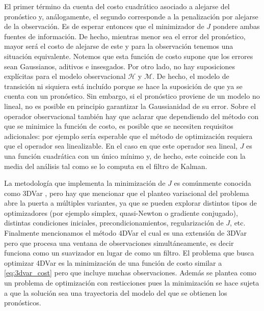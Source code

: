 El primer término da cuenta del costo cuadrático asociado a alejarse del pronóstico y, análogamente, el segundo corresponde a la penalización por alejarse de la observación. Es de esperar entonces que el minimizador de $J$ pondere ambas fuentes de información. De hecho, mientras menor sea el error del pronóstico, mayor será el costo de alejarse de este y para la observación tenemos una situación equivalente. Notemos que esta función de costo supone que los errores sean Gaussianos, aditivos e insesgados. Por otro lado, no hay suposiciones explícitas para el modelo observacional $\mathcal{H}$ y $\mathcal{M}$. De hecho, el modelo de transición ni siquiera está incluído porque se hace la suposición de que ya se cuenta con un pronóstico. Sin embargo, si el pronóstico proviene de un modelo no lineal, no es posible en principio garantizar la Gaussianidad de su error. Sobre el operador observacional también hay que aclarar que dependiendo del método con que se minimice la función de costo, es posible que se necesiten requisitos adicionales: por ejemplo sería esperable que el método de optimización requiera que el operador sea linealizable. En el caso en que este operador sea lineal, $J$ es una función cuadrática con un único mínimo y, de hecho, este coincide con la media del análisis tal como se lo computa en el filtro de Kalman.

La metodología que implementa la minimización de $J$ es comúnmente conocida como 3DVar \citep{Courtier1998}, pero hay que mencionar que el planteo variacional del problema abre la puerta a múltiples variantes, ya que se pueden explorar distintos tipos de optimizadores (por ejemplo simplex, quasi-Newton o gradiente conjugado), distintas condiciones iniciales, precondicionamientos, regularización de $J$, etc. Finalmente mencionamos el método 4DVar \citep{Talagrand1987, Rabier2003} el cual es una extensión de 3DVar pero que procesa una ventana de observaciones simultáneamente, es decir funciona como un suavizador en lugar de como un filtro. El problema que busca optimizar 4DVar es la minimización de una función de costo similar a \ref{eq:3dvar_cost} pero que incluye muchas observaciones. Además se plantea como un problema de optimización con resticciones pues la minimización se hace sujeta a que la solución sea una trayectoria del modelo del que se obtienen los pronósticos.

